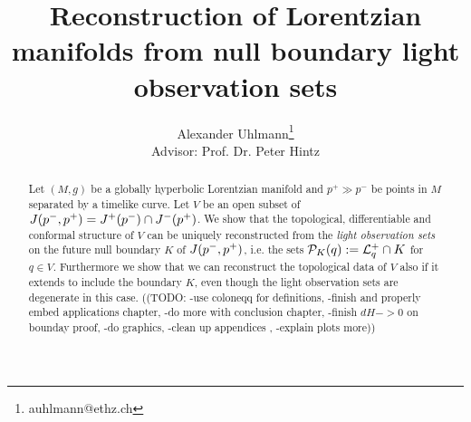 \documentclass[12pt,notitlepage]{report}
\title{Reconstruction of Lorentzian manifolds from null boundary light observation sets}
\author{Alexander Uhlmann\thanks{auhlmann@ethz.ch}\\
Advisor: Prof. Dr. Peter Hintz}
\begin{document}
\maketitle


\begin{abstract}
    Let $(M,g)$ be a globally hyperbolic Lorentzian manifold and $p^+\gg p^-$ be points in $M$ separated by a timelike curve. Let $V$ be an open subset of $J(p^-,p^+) = J^+(p^-)\cap J^-(p^+)$. We show that the topological, differentiable and conformal structure of $V$ can be uniquely reconstructed from the \emph{light observation sets} on the future null boundary $K$ of $J(p^-,p^+)$, i.e. the sets ${\mathcal{P}}_K(q) := {\mathcal{L}}^+_q \cap K$ for $q\in V$. Furthermore we show that we can reconstruct the topological data of $V$ also if it extends to include the boundary $K$, even though the light observation sets are degenerate in this case.
    ((TODO: 
    -use coloneqq for definitions, 
    -finish and properly embed applications chapter, 
    -do more with conclusion chapter, 
    -finish $dH->0$ on bounday proof, 
    -do graphics, 
    -clean up appendices ,
    -explain plots more))
\end{abstract}


\tableofcontents






%




%
%
%

%
%

\newpage

\nocite{*}
\printbibliography

\appendix





%

%
\end{document}
